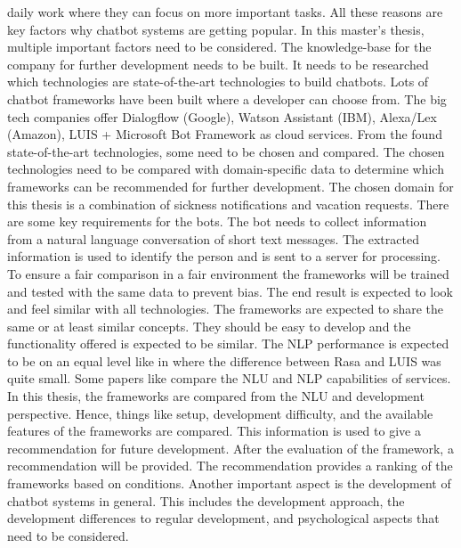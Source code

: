 daily work where they can focus on more important tasks.
All these reasons are key factors why chatbot systems are getting popular.
In this master's thesis, multiple important factors need to be considered.
The knowledge-base for the company for further development needs to be built.
It needs to be researched which technologies are state-of-the-art technologies to build chatbots.
Lots of chatbot frameworks have been built where a developer can choose from.
The big tech companies offer Dialogflow (Google), Watson Assistant (IBM),
Alexa/Lex (Amazon), LUIS + Microsoft Bot Framework as cloud services.
From the found state-of-the-art technologies, some need to be chosen and compared.
The chosen technologies need to be compared with domain-specific data to determine which frameworks can be 
recommended for further development.
The chosen domain for this thesis is a combination of sickness notifications and vacation requests.
There are some key requirements for the bots.
The bot needs to collect information from a natural language conversation of short text messages.
The extracted information is used to identify the person and is sent to a server for processing.
To ensure a fair comparison in a fair environment the frameworks will be trained and tested 
with the same data to prevent bias.
The end result is expected to look and feel similar with all technologies.
The frameworks are expected to share the same or at least similar concepts.
They should be easy to develop and the functionality offered is expected to be similar.
The NLP performance is expected to be on an equal level like in \citet{braunEvaluatingNLU} where the difference 
between Rasa and LUIS was quite small.
Some papers like \citet{braunEvaluatingNLU} compare the NLU and NLP capabilities of services.
In this thesis, the frameworks are compared from the NLU and development perspective.
Hence, things like setup, development difficulty, and 
the available features of the frameworks are compared.
This information is used to give a recommendation for future development.
After the evaluation of the framework, a recommendation will be provided.
The recommendation provides a ranking of the frameworks based on conditions. 
Another important aspect is the development of chatbot systems in general.
This includes the development approach, the development differences to 
regular development, and psychological aspects that need to be considered.


